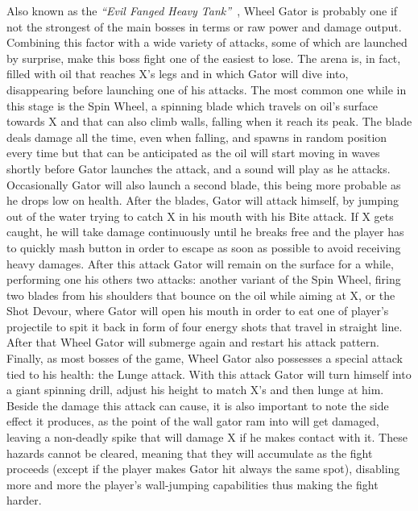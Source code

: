 Also known as the \textit{``Evil Fanged Heavy Tank''}~\cite{book:MMX_Complete_art}, Wheel Gator is probably one if not the strongest of the main bosses in terms or raw power and damage output. Combining this factor with a wide variety of attacks, some of which are launched by surprise, make this boss fight one of the easiest to lose. The arena is, in fact, filled with oil that reaches X's legs and in which Gator will dive into, disappearing before launching one of his attacks. The most common one while in this stage is the Spin Wheel, a spinning blade which travels on oil's surface towards X and that can also climb walls, falling when it reach its peak. The blade deals damage all the time, even when falling, and spawns in random position every time but that can be anticipated as the oil will start moving in waves shortly before Gator launches the attack, and a sound will play as he attacks. Occasionally Gator will also launch a second blade, this being more probable as he drops low on health. After the blades, Gator will attack himself, by jumping out of the water trying to catch X in his mouth with his Bite attack. If X gets caught, he will take damage continuously until he breaks free and the player has to quickly mash button in order to escape as soon as possible to avoid receiving heavy damages. After this attack Gator will remain on the surface for a while, performing one his others two attacks: another variant of the Spin Wheel, firing two blades from his shoulders that bounce on the oil while aiming at X, or the Shot Devour, where Gator will open his mouth in order to eat one of player's projectile to spit it back in form of four energy shots that travel in straight line. After that Wheel Gator will submerge again and restart his attack pattern. Finally, as most bosses of the game, Wheel Gator also possesses a special attack tied to his health: the Lunge attack. With this attack Gator will turn himself into a giant spinning drill, adjust his height to match X's and then lunge at him. Beside the damage this attack can cause, it is also important to note the side effect it produces, as the point of the wall gator ram into will get damaged, leaving a non-deadly spike that will damage X if he makes contact with it. These hazards cannot be cleared, meaning that they will accumulate as the fight proceeds (except if the player makes Gator hit always the same spot), disabling more and more the player's wall-jumping capabilities thus making the fight harder.

